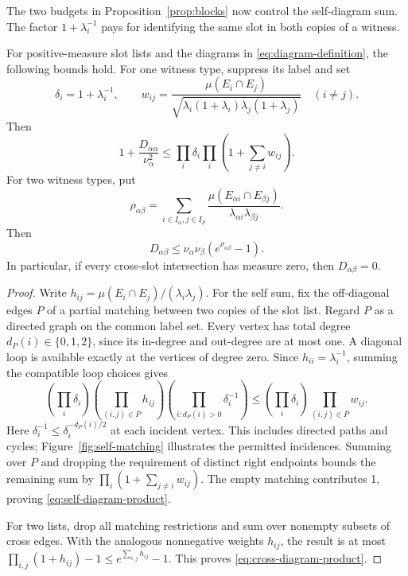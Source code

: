The two budgets in Proposition~\ref{prop:blocks} now control the
self-diagram sum. The factor $1+\lambda_i^{-1}$ pays for identifying
the same slot in both copies of a witness.

\begin{lemma}
\label{lem:diagrams}
For positive-measure slot lists and the diagrams in
\eqref{eq:diagram-definition}, the following bounds hold.
For one witness type, suppress its label and set
\[
 \delta_i=1+\lambda_i^{-1},\qquad
 w_{ij}=\frac{\mu(E_i\cap E_j)}
 {\sqrt{\lambda_i(1+\lambda_i)\lambda_j(1+\lambda_j)}}
 \quad(i\ne j).
\]
Then
\begin{equation}
 1+\frac{D_{\alpha\alpha}}{\nu_\alpha^2}
 \le\prod_i\delta_i\prod_i\left(1+\sum_{j\ne i}w_{ij}\right).
 \label{eq:self-diagram-product}
\end{equation}
For two witness types, put
\[
 \rho_{\alpha\beta}=
 \sum_{i\in I_\alpha,j\in I_\beta}
 \frac{\mu(E_{\alpha i}\cap E_{\beta j})}
      {\lambda_{\alpha i}\lambda_{\beta j}}.
\]
Then
\begin{equation}
 D_{\alpha\beta}\le\nu_\alpha\nu_\beta
                         (e^{\rho_{\alpha\beta}}-1).
 \label{eq:cross-diagram-product}
\end{equation}
In particular, if every cross-slot intersection has measure zero,
then $D_{\alpha\beta}=0$.
\end{lemma}

\begin{proof}
Write $h_{ij}=\mu(E_i\cap E_j)/(\lambda_i\lambda_j)$.
For the self sum, fix the off-diagonal edges $P$ of a partial matching
between two copies of the slot list. Regard $P$ as a directed graph on
the common label set. Every vertex has total degree
$d_P(i)\in\{0,1,2\}$, since its in-degree and out-degree are at most
one. A diagonal loop is available exactly at the vertices of degree
zero. Since $h_{ii}=\lambda_i^{-1}$, summing the compatible loop
choices gives
\[
 \left(\prod_i\delta_i\right)
 \left(\prod_{(i,j)\in P}h_{ij}\right)
 \left(\prod_{i:d_P(i)>0}\delta_i^{-1}\right)
 \le\left(\prod_i\delta_i\right)\prod_{(i,j)\in P}w_{ij}.
\]
Here $\delta_i^{-1}\le \delta_i^{-d_P(i)/2}$ at each incident vertex.
This includes directed paths and cycles; Figure~\ref{fig:self-matching}
illustrates the permitted incidences. Summing over $P$ and dropping
the requirement of distinct right endpoints bounds the remaining sum
by $\prod_i(1+\sum_{j\ne i}w_{ij})$. The empty matching contributes
1, proving \eqref{eq:self-diagram-product}.

For two lists, drop all matching restrictions and sum over nonempty
subsets of cross edges. With the analogous nonnegative weights $h_{ij}$,
the result is at most
$\prod_{i,j}(1+h_{ij})-1\le e^{\sum_{i,j}h_{ij}}-1$.
This proves \eqref{eq:cross-diagram-product}.
\end{proof}

